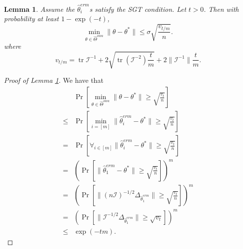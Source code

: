 \documentclass[twoside]{article}
\newtheorem{lemma}{Lemma}
\DeclareMathOperator*{\tr}{tr}
\newcommand{\Wowa}{{\hat \Theta^{\textit{owa}}}}
\newcommand{\w}{\theta}
\newcommand{\wmle}{\hat\w^{erm}}
\newcommand{\wstar}{{\w^{*}}}
\newcommand{\I}{\mathcal I}
\newcommand{\ltwo}[1]{{\lVert {#1} \rVert}}
\newcommand{\prob}[1]{\Pr\left[{#1}\right]}
\begin{document}
\begin{lemma}
\label{lemma:wwstar}
Assume the $\wmle_i$s satisfy the SGT condition.
Let $t>0$. 
Then with probability at least $1-\exp(-t)$,
\begin{equation}
\min_{\w\in\Wowa}\ltwo{\w-\wstar} \le \sigma\sqrt{\frac{v_{t/m}}{n}}
.
\end{equation}
where
\begin{equation}
\label{eq:vtm}
v_{t/m} =
\tr{\I^{-1}}
+ 2\sqrt{\tr \left({\I^{-2}}\right)\frac{t}{m}}
+ 2\ltwo{\I^{-1}}\frac{t}{m}
.
\end{equation}
\end{lemma}


\begin{proof}[Proof of Lemma \ref{lemma:wwstar}]
We have that
\begin{align}
&\prob{\min_{\w\in\Wowa} \ltwo{\w-\wstar} \ge \sqrt{\frac{v_t}{n}}} 
\\
\le &
\prob{\min_{i=[m]} \ltwo{\wmle_i-\wstar} \ge \sqrt{\frac{v_t}{n}}}
\\
= &
\prob{\forall_{i\in[m]} \ltwo{\wmle_i-\wstar} \ge \sqrt{\frac{v_t}{n}}} 
\\
= &
\left(\prob{\ltwo{\wmle_1-\wstar} \ge \sqrt{\frac{v_t}{n}}} \right)^m
\\
= &
\left(
\prob{\ltwo{(n\I)^{-1/2}\Delta_{\wmle_1}} \ge \sqrt{\frac{v_t}{n}} }
\right)^m
\\
= &
\left(
\prob{\ltwo{\I^{-1/2}\Delta_{\wmle_1}} \ge \sqrt{v_t} }
\right)^m
\\
\le &
\exp(-tm)
.
\end{align}
\end{proof}
\end{document}

